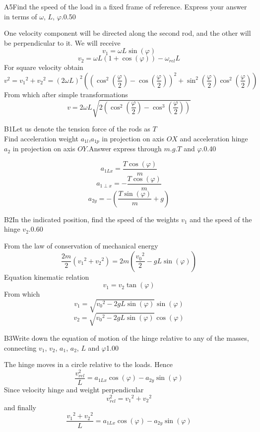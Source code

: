 \documentclass[11pt,a4paper]{article}
\begin{document}
\begin{solcard}{A5}{Find the speed of the load in a fixed frame of reference. Express your answer in terms of $\omega$, $L$, $\varphi$.}{0.50}

One velocity component will be directed along the second rod, and the other will be perpendicular to it. We will receive $$v_1={\omega}L\sin(\varphi) $$ $$v_2={\omega}L(1+\cos(\varphi))-{\omega_{rel}}L $$ For square velocity obtain $$v^2={v_1}^2+{v_2}^2=(2\omega{L})^2\left(\left(\cos^2\left(\frac{\varphi}{2}\right)-\cos\left(\frac{\varphi}{2}\right)\right)^2+\sin^2\left(\frac{\varphi}{2}\right)\cos^2\left(\frac{\varphi}{2}\right)\right) $$ From which after simple transformations $$v=2{\omega}L\sqrt{2\left(\cos^2\left(\frac{\varphi}{2}\right)-\cos^3\left(\frac{\varphi}{2}\right)\right)} $$

\end{solcard}

\begin{solcard}{B1}{Let us denote the tension force of the rods as $T$ $$ $$ Find acceleration weight $a_{1l}$,$a_{1p}$ in projection on axis $OX$ and acceleration hinge $a_2$ in projection on axis $OY$.Answer express through $m$.$g$.$T$ and $\varphi$.}{0.40}

$$a_{1Lx}=\frac{T\cos(\varphi)}{m} $$ $$a_{1\perp x}=-\frac{T\cos(\varphi)}{m} $$ $$a_{2y}=-\left(\frac{T\sin(\varphi)}{m}+g\right) $$

\end{solcard}

\begin{solcard}{B2}{In the indicated position, find the speed of the weights $v_1$ and the speed of the hinge $v_2$.}{0.60}

From the law of conservation of mechanical energy $$\frac{2m}{2}({v_1}^2+{v_2}^2)=2m\left(\frac{{v_0}^2}{2}-gL\sin(\varphi)\right) $$ Equation kinematic relation $${v_1}={v_2}\tan(\varphi) $$ From which $$v_1=\sqrt{{v_0}^2-2gL\sin(\varphi)}\sin(\varphi) $$ $$v_2=\sqrt{{v_0}^2-2gL\sin(\varphi)}\cos(\varphi) $$

\end{solcard}

\begin{solcard}{B3}{Write down the equation of motion of the hinge relative to any of the masses, connecting $v_1$, $v_2$, $a_1$, $a_2$, $L$ and $\varphi$}{1.00}

The hinge moves in a circle relative to the loads. Hence $$\frac{v^2_{rel}}{L}={a_{1Lx}}\cos(\varphi)-{a_{2y}}\sin(\varphi) $$ Since velocity hinge and weight perpendicular $$v^2_{rel}={v_1}^2+{v_2}^2 $$ and finally $$\frac{{v_1}^2+{v_2}^2}{L}={a_{1Lx}}\cos(\varphi)-{a_{2y}}\sin(\varphi) $$

\end{solcard}
\end{document}
